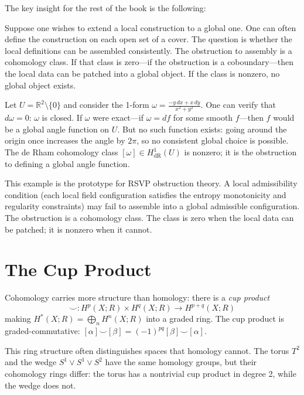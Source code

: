 \documentclass[12pt, twoside, openright, a4paper]{book}
\newcommand{\R}{\mathbb{R}}
\begin{document}
The key insight for the rest of the book is the following:

Suppose one wishes to extend a local construction to a global one.
One can often define the construction on each open set of a cover.
The question is whether the local definitions can be assembled consistently.
The obstruction to assembly is a cohomology class.
If that class is zero---if the obstruction is a coboundary---then the local data can be patched into a global object.
If the class is nonzero, no global object exists.

\begin{examplebox}
Let $U = \R^2 \setminus \{0\}$ and consider the 1-form $\omega = \frac{-y\,dx + x\,dy}{x^2+y^2}$.
One can verify that $d\omega = 0$: $\omega$ is closed.
If $\omega$ were exact---if $\omega = df$ for some smooth $f$---then $f$ would be a global angle function on $U$.
But no such function exists: going around the origin once increases the angle by $2\pi$, so no consistent global choice is possible.
The de Rham cohomology class $[\omega] \in H^1_{\mathrm{dR}}(U)$ is nonzero; it is the obstruction to defining a global angle function.
\end{examplebox}

This example is the prototype for RSVP obstruction theory.
A local admissibility condition (each local field configuration satisfies the entropy monotonicity and regularity constraints) may fail to assemble into a global admissible configuration.
The obstruction is a cohomology class.
The class is zero when the local data can be patched; it is nonzero when it cannot.

\section{The Cup Product}

Cohomology carries more structure than homology: there is a \emph{cup product}
\[\smile: H^p(X;R) \times H^q(X;R) \to H^{p+q}(X;R)\]
making $H^*(X;R) = \bigoplus_n H^n(X;R)$ into a graded ring.
The cup product is graded-commutative: $[\alpha] \smile [\beta] = (-1)^{pq}[\beta] \smile [\alpha]$.

This ring structure often distinguishes spaces that homology cannot.
The torus $T^2$ and the wedge $S^1 \vee S^1 \vee S^2$ have the same homology groups, but their cohomology rings differ: the torus has a nontrivial cup product in degree 2, while the wedge does not.


\end{document}
